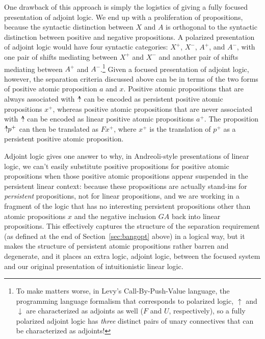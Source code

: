 One drawback of this approach is simply the logistics of giving 
a fully focused presentation
of adjoint logic. We end up with a proliferation of propositions,
because the syntactic distinction between $X$ and $A$ is orthogonal to
the syntactic distinction between positive and negative
propositions. A polarized presentation of adjoint logic would have
four syntactic categories: $X^+$, $X^-$, $A^+$, and $A^-$, with one
pair of shifts mediating between $X^+$ and $X^-$ and another pair of
shifts mediating between $A^+$ and $A^-$.\footnote{To make matters
  worse, in Levy's Call-By-Push-Value language, the programming
  language formalism that corresponds to polarized logic, ${\uparrow}$
  and ${\downarrow}$ are characterized as adjoints as well ($F$ and
  $U$, respectively), so a fully polarized adjoint logic has {\it
    three} distinct pairs of unary connectives that can be
  characterized as adjoints!}
Given a focused presentation of adjoint logic, however, 
the separation criteria discussed above can be
in terms of the two forms of positive atomic proposition $a$ and $x$. 
Positive atomic propositions that are always associated with
${\mbox{\hspace{2pt}$\mathbb !$\hspace{-4.44pt}$^\wedge$\hspace{-1pt}}}$ can be encoded as persistent positive atomic
propositions $x^+$, whereas positive atomic propositions that are never
associated with ${\mbox{\hspace{2pt}$\mathbb !$\hspace{-4.44pt}$^\wedge$\hspace{-1pt}}}$ can be encoded as linear positive atomic
propositions $a^+$. The proposition ${\mbox{\hspace{2pt}$\mathbb !$\hspace{-4.44pt}$^\wedge$\hspace{-1pt}}}p^+$ can then be
translated as $F x^+$, where $x^+$ is the translation of $p^+$ as a
persistent positive atomic proposition.

Adjoint logic gives one answer to why, in Andreoli-style
presentations of linear logic, we can't easily substitute positive
propositions for positive atomic propositions when those positive
atomic propositions appear suspended in the persistent linear context:
because these propositions are actually stand-ins for {\it persistent}
propositions, not for linear propositions, and we are working in a
fragment of the logic that has no interesting persistent propositions
other than atomic propositions $x$ and the negative inclusion $G A$
back into linear propositions.  This effectively captures the
structure of the separation requirement (as defined at the end of
Section~\ref{sec:bangopt} above) in a logical way, but it makes the
structure of persistent atomic propositions rather barren and
degenerate, and it places an extra logic, adjoint logic, between the
focused system and our original presentation of intuitionistic linear
logic.

